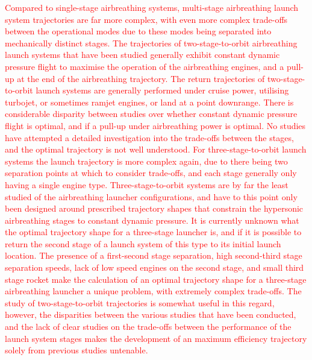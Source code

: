  	   \textcolor{red}{
  	  Compared to single-stage airbreathing systems, multi-stage airbreathing launch system trajectories are far more complex, with even more complex trade-offs between the operational modes due to these modes being separated into mechanically distinct stages\cite{Bulirsch1995}. The trajectories of two-stage-to-orbit airbreathing launch systems that have been studied generally exhibit constant dynamic pressure flight to maximise the operation of the airbreathing engines, and a pull-up at the end of the airbreathing trajectory. The return trajectories of two-stage-to-orbit launch systems are generally performed under cruise power, utilising turbojet, or sometimes ramjet engines\cite{Wilhite1991,Mehta2001,Eklund2012,Bradford2002}, or land at a point downrange\cite{Takahashi1997}. There is considerable disparity between studies over whether constant dynamic pressure flight is optimal, and if a pull-up under airbreathing power is optimal\cite{Wilhite1991,Fujikawa2017,Mehta2001,Takahashi1997,Aberleen,Germain2001,Eklund2012,Bradford2002,Kimura1999,Preller2018a}. No studies have attempted a detailed investigation into the trade-offs between the stages, and the optimal trajectory is not well understood. 
  	   For three-stage-to-orbit launch systems the launch trajectory is more complex again, due to there being two separation points at which to consider trade-offs, and each stage generally only having a single engine type. Three-stage-to-orbit systems are by far the least studied of the airbreathing launcher configurations, and have to this point only been designed around prescribed trajectory shapes that constrain the hypersonic airbreathing stages to constant dynamic pressure\cite{Kimura1999,Preller2018a}. It is currently unknown what the optimal trajectory shape for a three-stage launcher is, and if it is possible to return the second stage of a launch system of this type to its initial launch location. The presence of a first-second stage separation, high second-third stage separation speeds, lack of low speed engines on the second stage, and small third stage rocket make the calculation of an optimal trajectory shape for a three-stage airbreathing launcher a unique problem, with extremely complex trade-offs. The study of two-stage-to-orbit trajectories is somewhat useful in this regard, however, the disparities between the various studies that have been conducted, and the lack of clear studies on the trade-offs between the performance of the launch system stages makes the development of an maximum efficiency trajectory solely from previous studies untenable. 
  	}
  	   
